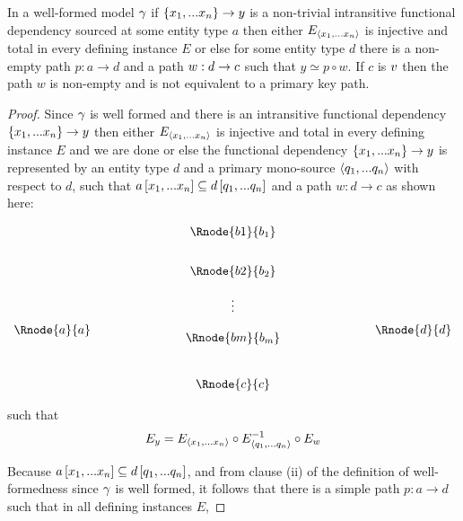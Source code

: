 \begin{lemma}
\label{intransitivelemma}
In a well-formed model $\gamma$ if $\left\{x_1,...x_n\right\} \rightarrow y$  is a non-trivial intransitive
functional dependency sourced at some entity type $a$ then either $E_{\langle x_1,...x_n\rangle}$ is injective and total in every defining instance $E$ 
or else for some entity type $d$ there is a non-empty path $p:a \rightarrow d$
and a  path $w:d \rightarrow c$  such that $y \simeq p \circ w$. If $c$ is $v$ then
the path $w$ is non-empty and is not equivalent to a primary key path.
\end{lemma}
\begin{proof}
Since $\gamma$ is well formed  and there is an intransitive functional dependency $\left\{x_1,...x_n\right\} \rightarrow y$ then either $E_{\langle x_1,...x_n\rangle}$ is injective and total in every defining instance $E$  and we are done or else the functional dependency
$\left\{x_1,...x_n\right\} \rightarrow y$   is represented 
by  an entity type $d$ and 
a primary mono-source $\langle q_1,...q_n\rangle$ with respect to
$d$, such that $a\left[x_1,...x_n\right]\subseteq d\left[q_1,...q_n\right]$ and a 
path $w:d\rightarrow c$ as shown here:

\setlength{\arraycolsep}{.2cm}
\begin{center}
$
\begin{array}{cp{2cm}c p{2cm} c}
             &  & \Rnode{b1}{b_1} & &               \\ [0.7cm]
						 &  & \Rnode{b2}{b_2} & &               \\ [0.4cm]
						 &  &     \vdots      & &               \\ [0.2cm]
\Rnode{a}{a} &  &                 & & \Rnode{d}{d}  \\ [-0.2cm]
             &  & \Rnode{bm}{b_m} & &               \\ [0.9cm]
             &  & \Rnode{c}{c}    & &               \\
\end{array}
$
\end{center}
such that
\begin{equation}
\label{fundependency}
E_y = E_{\langle x_1,...x_n\rangle} \circ E_{\langle q_1,...q_n\rangle}^{-1} \circ E_w
\end{equation}

Because $a\left[x_1,...x_n\right]\subseteq d\left[q_1,...q_n\right]$,  and from
clause (ii) of the definition of well-formedness since $\gamma$ is well formed, it follows that
there  is a simple path $p:a \rightarrow d$ such
that 
in all defining instances $E$,


\end{proof}
